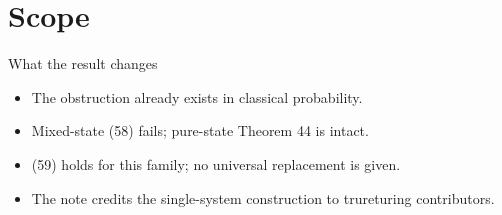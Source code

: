 \documentclass{beamer}
\begin{document}
\section{Scope}
\begin{frame}{What the result changes}
\begin{itemize}
\item The obstruction already exists in classical probability.
\item Mixed-state (58) fails; pure-state Theorem 44 is intact.
\item (59) holds for this family; no universal replacement is given.
\item The note credits the single-system construction to trureturing contributors.
\end{itemize}
\end{frame}
\appendix
\end{document}
